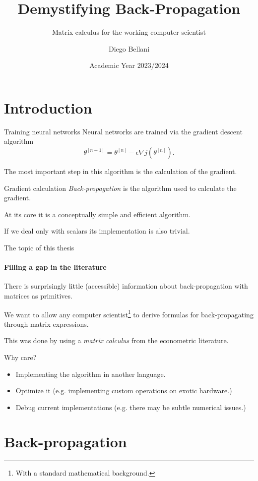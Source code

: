 \documentclass[noamsthm]{beamer}
\title{Demystifying Back-Propagation}
\subtitle{Matrix calculus for the working computer scientist}
\author{Diego Bellani}
\date{Academic Year 2023/2024}
\begin{document}
\maketitle

\section{Introduction}

\begin{frame}{Training neural networks}
Neural networks are trained via the gradient descent algorithm
\[\theta^{[n+1]} = \theta^{[n]} - \epsilon \nabla j\!\left(\theta^{[n]}\right)\!.\]

The most important step in this algorithm is the calculation of the gradient.
\end{frame}

\begin{frame}{Gradient calculation}
\emph{Back-propagation} is the algorithm used to calculate the gradient.

At its core it is a conceptually simple and efficient algorithm.

If we deal only with scalars its implementation is also trivial.
\end{frame}

\begin{frame}{The topic of this thesis}
\framesubtitle{Filling a gap in the literature}
There is surprisingly little (accessible) information about back-propagation
with matrices as primitives.

We want to allow any computer scientist\footnote{With a standard mathematical background.}
to derive formulas for back-propagating through matrix expressions.

This was done by using a \emph{matrix calculus} from the econometric literature.
\end{frame}

\begin{frame}{Why care?}
\begin{itemize}
\item Implementing the algorithm in another language.
\item Optimize it (e.g. implementing custom operations on exotic hardware.)
\item Debug current implementations (e.g. there may be subtle numerical issues.)
\end{itemize}
\end{frame}

\section{Back-propagation}
\end{document}
